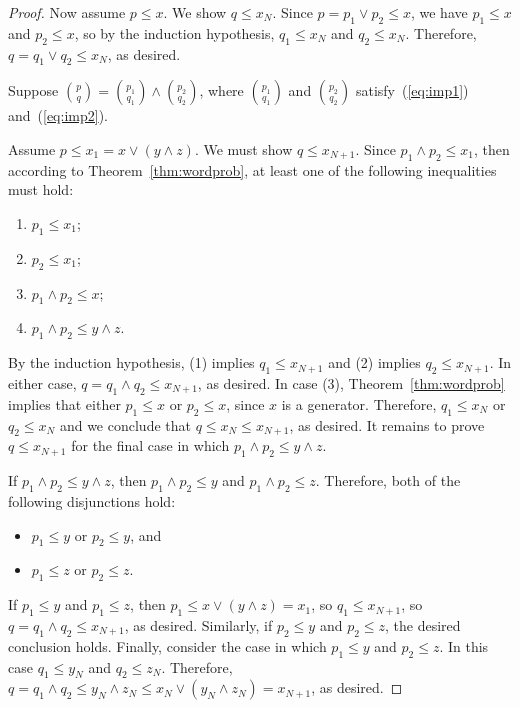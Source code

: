 {\begin{proof}
Now assume $p\leqslant x$. We show $q\leqslant x_N$. 
Since $p = p_1 \vee p_2 \leq x$, we have 
$p_1 \leqslant x$ and 
$p_2 \leqslant x$, so by the induction hypothesis,  
$q_1 \leqslant x_{N}$ and 
$q_2 \leqslant x_{N}$.  Therefore, $q = q_1 \vee q_2 \leq x_{N}$, as desired.


\medskip
{} Suppose $\binom{p}{q} = \binom{p_1}{q_1} \wedge \binom{p_2}{q_2}$, where $\binom{p_1}{q_1}$ and $\binom{p_2}{q_2}$ satisfy~(\ref{eq:imp1}) and~(\ref{eq:imp2}). 

Assume $p\leqslant x_1 = x \vee (y \wedge z)$. 
We must show $q\leqslant x_{N+1}$. 
Since $p_1 \wedge p_2 \leqslant x_1$, then according to Theorem~\ref{thm:wordprob}, at least one of the following inequalities must hold:
\begin{enumerate}
  \item $p_1 \leqslant x_1$;
  \item $p_2 \leqslant x_1$;
  \item $p_1 \wedge p_2 \leqslant x$;
  \item $p_1 \wedge p_2 \leqslant y \wedge z$.
\end{enumerate}
By the induction hypothesis, (1) implies $q_1 \leq x_{N+1}$  and (2) implies $q_2 \leq x_{N+1}$.  In either case, $q = q_1 \wedge q_2 \leq x_{N+1}$, as desired.  In case (3), Theorem~\ref{thm:wordprob} implies that either $p_1 \leq x$ or $p_2 \leq x$, since $x$ is a generator. Therefore, $q_1 \leq x_N$ or $q_2 \leq x_N$ and we conclude that 
$q \leq x_N \leq x_{N+1}$, as desired.  It remains to prove $q \leq x_{N+1}$ for the final case in which $p_1 \wedge p_2 \leq y \wedge z$. 

If $p_1 \wedge p_2 \leq y \wedge z$, then 
$p_1 \wedge p_2 \leq y$ and $p_1 \wedge p_2 \leq z$. Therefore, both of the following disjunctions hold:
\begin{itemize}
  \item $p_1 \leq y$ or $p_2 \leq y$, and 
  \item $p_1 \leq z$ or $p_2 \leq z$. 
\end{itemize}
If $p_1 \leq y$ and $p_1 \leq z$, then $p_1 \leq x \vee (y\wedge z) = x_1$, so $q_1 \leq x_{N+1}$, so $q = q_1\wedge q_2 \leq x_{N+1}$, as desired.
Similarly, if $p_2 \leq y$ and $p_2 \leq z$, the desired conclusion holds.
Finally, consider the case in which $p_1 \leq y$ and $p_2 \leq z$. In this case $q_1 \leq y_N$ and $q_2 \leq z_N$.  Therefore, $q = q_1 \wedge q_2 \leq y_N \wedge z_N \leq x_N \vee (y_N\wedge z_N) = x_{N+1}$, as desired.



\end{proof}}
